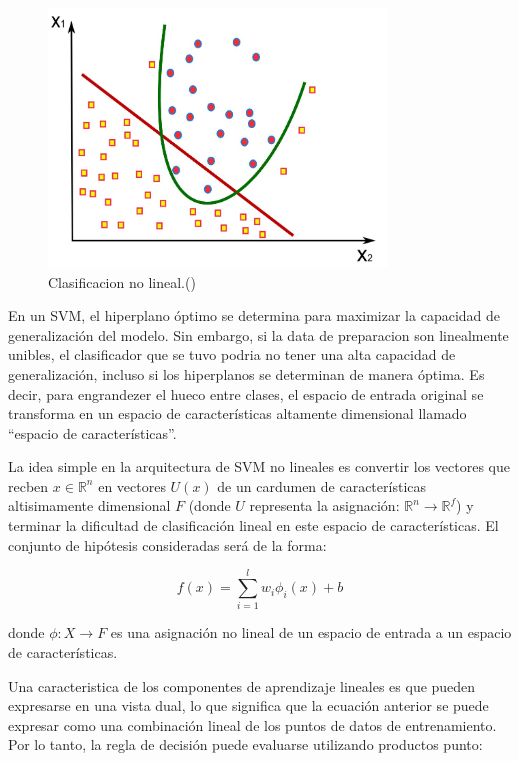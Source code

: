  \begin{figure}[H]
	\begin{center}
		\includegraphics[width=0.8\textwidth]{2/figures/svm4.jpeg}
		\caption{Clasificacion no lineal.(\cite{tecnica3})}
	\end{center}
\end{figure}

En un SVM, el hiperplano óptimo se determina para maximizar la capacidad de generalización del modelo. Sin embargo, si la data de preparacion son linealmente unibles, el clasificador que se tuvo podria no tener una alta capacidad de generalización, incluso si los hiperplanos se determinan de manera óptima. Es decir, para engrandezer el hueco entre clases, el espacio de entrada original se transforma en un espacio de características altamente dimensional llamado ``espacio de características''.

La idea simple en la arquitectura de SVM no lineales es convertir los vectores que recben $x \in \mathbb{R}^n$ en vectores $U(x)$ de un cardumen de características altisimamente dimensional $F$ (donde $U$ representa la asignación: $\mathbb{R}^n \rightarrow \mathbb{R}^f$) y terminar la dificultad de clasificación lineal en este espacio de características. El conjunto de hipótesis consideradas será de la forma:

\[
f(x) = \sum_{i=1}^{l} w_i \phi_i(x) + b
\]

donde $\phi: X \rightarrow F$ es una asignación no lineal de un espacio de entrada a un espacio de características.

Una caracteristica de los componentes de aprendizaje lineales es que pueden expresarse en una vista dual, lo que significa que la ecuación anterior se puede expresar como una combinación lineal de los puntos de datos de entrenamiento. Por lo tanto, la regla de decisión puede evaluarse utilizando productos punto:

